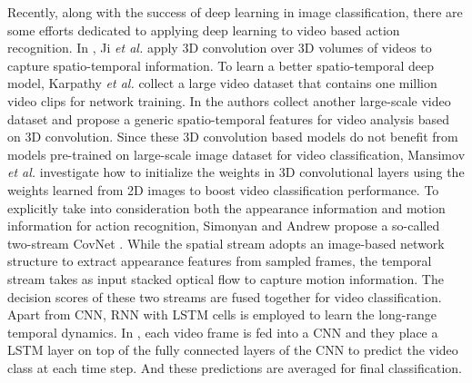\documentclass[journal]{IEEEtran}
\begin{document}
Recently, along with the success of deep learning in image classification, there are some efforts dedicated to applying deep learning to video based action recognition. In \cite{6165309}, Ji \textit{et al.}
apply 3D convolution over 3D volumes of videos to capture spatio-temporal information. To learn a better spatio-temporal deep model, Karpathy \textit{et al.}
\cite{KarpathyCVPR14} collect a large video dataset that contains one million video clips for network training. In \cite{arXiv:1412.0767} the authors collect another large-scale video dataset and propose a generic spatio-temporal features for video analysis based on 3D convolution. Since these 3D convolution based models do not benefit from models pre-trained on large-scale image dataset for video classification, Mansimov \textit{et al.} investigate how to initialize the weights in 3D convolutional layers using the weights learned from 2D images to boost video classification performance. To explicitly take into consideration both the appearance information and motion information for action recognition, Simonyan and Andrew propose a so-called two-stream CovNet \cite{Andrew14}. While the spatial stream adopts an image-based network
structure to extract appearance features from sampled frames, the temporal stream takes as input stacked optical flow to capture motion
information. The decision scores of these two streams are fused together for video classification. Apart from CNN, RNN with LSTM cells \cite{Hochreiter:1997:LSM} is employed to learn the long-range temporal dynamics. In \cite{Donahue_2015_CVPR}, each video frame is fed into a CNN and they place a LSTM layer on top of the fully connected layers of the CNN to predict the video class at each time step. And these predictions are averaged for final classification.
\end{document}

